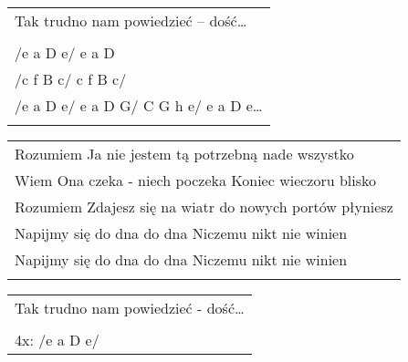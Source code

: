 \documentclass[a5paper]{article}
\begin{document}
\noindent
\begin{tabular}{@{}p{8.00cm}@{}}
Tak trudno nam powiedzieć – dość… \\ \\

/e a D e/ e a D \\
/c f B c/ c f B c/ \\
/e a D e/ e a D G/ C G h e/ e a D e… \\ \\
\end{tabular}

\noindent
\begin{tabular}{@{}p{9.00cm}@{}}
Rozumiem Ja nie jestem tą potrzebną nade wszystko \\
Wiem Ona czeka - niech poczeka Koniec wieczoru blisko \\
Rozumiem Zdajesz się na wiatr do nowych portów płyniesz \\
Napijmy się do dna do dna Niczemu nikt nie winien \\ 
Napijmy się do dna do dna Niczemu nikt nie winien \\ \\
\end{tabular}

\noindent
\begin{tabular}{@{}p{8.00cm}@{}}
Tak trudno nam powiedzieć - dość… \\ \\

4x: /e a D e/
\end{tabular}
\end{document}
